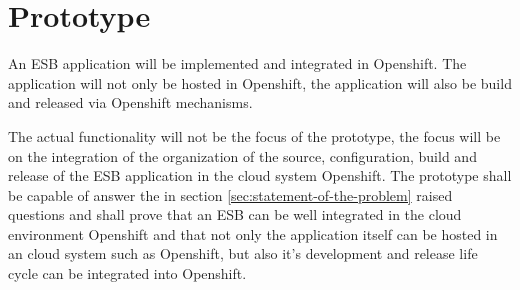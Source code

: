 \section{Prototype}
\label{sec:prototype}
An ESB application will be implemented and integrated in Openshift. The application will not only be hosted in Openshift, the application will also be build and released via Openshift mechanisms.

The actual functionality will not be the focus of the prototype, the focus will be on the integration of the organization of the source, configuration, build and release of the ESB application in the cloud system Openshift. The prototype shall be capable of answer the in section \ref{sec:statement-of-the-problem} raised questions and shall prove that an ESB can be well integrated in the cloud environment Openshift and that not only the application itself can be hosted in an cloud system such as Openshift, but also it's development and release life cycle can be integrated into Openshift.





 